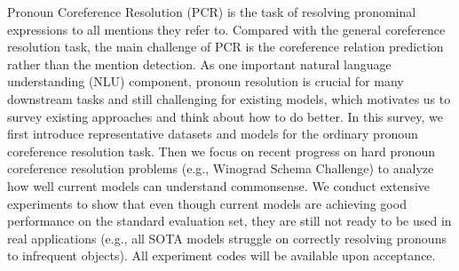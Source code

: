 Pronoun Coreference Resolution (PCR) is the task of resolving pronominal expressions to all mentions they refer to. Compared with the general coreference resolution task, the main challenge of PCR is the coreference relation prediction rather than the mention detection. As one important natural language understanding (NLU) component, pronoun resolution is crucial for many downstream tasks and still challenging for existing models, which motivates us to survey existing approaches and think about how to do better. In this survey, we first introduce representative datasets and models for the ordinary pronoun coreference resolution task. Then we focus on recent progress on hard pronoun coreference resolution problems (e.g., Winograd Schema Challenge) to analyze how well current models can understand commonsense. We conduct extensive experiments to show that even though current models are achieving good performance on the standard evaluation set, they are still not ready to be used in real applications (e.g., all SOTA models struggle on correctly resolving pronouns to infrequent objects). All experiment codes will be available upon acceptance.
